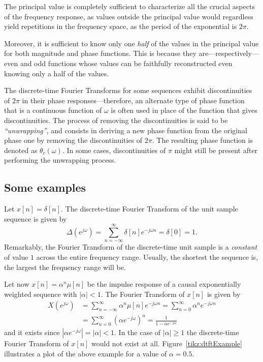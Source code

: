 \documentclass[\documentfontsize, twocolumn]{\classname}
\begin{document}
The principal value is completely sufficient to characterize all the crucial aspects of the frequency response, as values outside the principal value would regardless yield repetitions in the frequency space, as the period of the exponential is $2\pi$.

Moreover, it is sufficient to know only one \emph{half} of the values in the principal value for both magnitude and phase functions. This is because they are---respectively---even and odd functions whose values can be faithfully reconstructed even knowing only a half of the values.

The discrete-time Fourier Transforms for some sequences exhibit discontinuities of $2\pi$ in their phase res\-pon\-ses---the\-re\-fo\-re, an alternate type of phase function that is a continuous function of $\omega$ is often used in place of the function that gives discontinuities. The process of removing the discontinuities is said to be \emph{``unwrapping''}, and consists in deriving a new phase function from the original phase one by removing the discontinuities of $2\pi$. The resulting phase function is denoted as $\theta_c(\omega)$. In some cases, discontinuities of $\pi$ might still be present after performing the unwrapping process.

\subsection{Some examples}\label{sec:someExamplesDTFT}
Let $x[n] = \delta[n]$. The discrete-time Fourier Transform of the unit sample sequence is given by
\[
    \Delta(e^{j\omega}) = \sum_{n=-\infty}^\infty \delta[n]e^{-j\omega n} = \delta[0] = 1.
\]
Remarkably, the Fourier Transform of the discrete-time unit sample is a \emph{constant} of value $1$ across the entire frequency range. Usually, the shortest the sequence is, the largest the frequency range will be.

Let now $x[n] = \alpha^n\mu[n]$ be the impulse response of a causal exponentially weighted sequence with $|\alpha|<1$. The Fourier Transform of $x[n]$ is given by
\begin{align*}
    X(e^{j\omega}) &= \sum_{n=-\infty}^\infty \alpha^n\mu[n]e^{-j\omega n} = \sum_{n=0}^\infty \alpha^n e^{-j\omega n} \\
                   &= \sum_{n=0}^\infty \left(\alpha e^{-j\omega}\right)^n = \frac{1}{1-\alpha e^{-j\omega}}
\end{align*}
and it exists since $\left|\alpha e^{-j\omega}\right| = |\alpha| < 1$. In the case of $|\alpha| \geq 1$ the discrete-time Fourier Transform of $x[n]$ would not exist at all. Figure~\ref{tikz:dtftExample} illustrates a plot of the above example for a value of $\alpha=0.5$.
\end{document}
